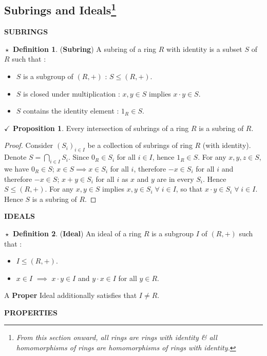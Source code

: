 \documentclass{article}
\theoremstyle{definition}
\newtheorem{definition}{$\boxed{\star}$ Definition}
\theoremstyle{remark}
\theoremstyle{definition}
\theoremstyle{definition}
\newtheorem{proposition}{$\checkmark$ Proposition}
\theoremstyle{definition}
\theoremstyle{proof}
\begin{document}
\subsection{Subrings and Ideals\protect\footnote{\emph{From this section onward, all rings are rings with identity \& all homomorphisms of rings are homomorphisms of rings with identity.}}}
\hrulefill
\textbf{SUBRINGS}
\hrulefill
\begin{definition}
	(\textbf{Subring}) A subring of a ring $ R $ with identity is a subset $ S $ of $ R $ such that :
	\begin{itemize}
		\item{$ S $ is a subgroup of $ (R,+) $ : $ S\le (R,+) $.}
		\item{$ S $ is closed under multiplication : $ x,y\in S $ implies $ x\cdot y\in S $.}
		\item{$ S $ contains the identity element : $ 1_R \in S $.}
	\end{itemize}
\end{definition}
\hrulefill
\begin{proposition}
	Every intersection of subrings of a ring $ R $ is a subring of $ R $.
\end{proposition}
\begin{proof}
	Consider $ (S_i)_{i\in I} $ be a collection of subrings of ring $ R $ (with identity). Denote $ S = \bigcap_{i\in I} S_i $. Since $ 0_R \in S_i $ for all $ i\in I $, hence $ 1_R \in S $. For any $ x,y,z \in S$, we have $ 0_R\in S $; $ x\in S \implies x\in S_{i}$ for all $ i $, therefore $ -x \in S_i $ for all $ i $ and therefore $ -x\in S $; $ x+ y \in S_i $ for all $ i $ as $ x $ and $ y $ are in every $ S_i $. Hence $ S \le (R,+)$. For any $ x,y\in S $ implies $ x,y \in S_i \;\forall \;i\in I $, so that $ x\cdot y \in S_i \;\forall \;i\in I $. Hence $ S $ is a subring of $ R$.
\end{proof}
\hrulefill
\textbf{IDEALS}
\hrulefill
\begin{definition}
	(\textbf{Ideal}) An ideal of a ring $ R $ is a subgroup $ I $ of $ (R,+) $ such that :
	\begin{itemize}
		\item{$ I \le (R,+) $.}
		\item{$ x\in I $ $ \implies $ $ x\cdot y\in I $ and $ y\cdot x\in I $ for all $ y\in R $.}
	\end{itemize}
A \textbf{Proper} Ideal additionally satisfies that $ I\neq R $.
\end{definition}
\hrulefill
\textbf{PROPERTIES}
\hrulefill
\end{document}
